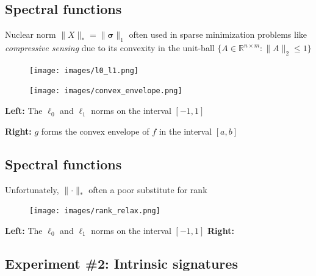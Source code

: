 \documentclass[
  letterpaper,
  DIV=11,
  numbers=noendperiod,
  oneside]{scrartcl}
\begin{document}
\subsection{Spectral functions}\label{spectral-functions-2}

Nuclear norm \(\lVert X \rVert_\ast = \lVert \mathbf{\sigma} \rVert_1\)
often used in sparse minimization problems like \emph{compressive
sensing} due to its convexity in the unit-ball
\(\{A \in \mathbb{R}^{n \times m} : \lVert A \rVert_2 \leq 1 \}\)

\begin{figure}

\begin{minipage}[b]{0.50\linewidth}

{\centering 

\texttt{[image: images/l0\_l1.png]}

}

\end{minipage}%
%
\begin{minipage}[b]{0.50\linewidth}

{\centering 

\texttt{[image: images/convex\_envelope.png]}

}

\end{minipage}%

\end{figure}

\textbf{Left:} The \(\ell_0\) and \(\ell_1\) norms on the interval
\([-1,1]\)

\textbf{Right:} \(g\) forms the convex envelope of \(f\) in the interval
\([a,b]\)

\subsection{Spectral functions}\label{spectral-functions-3}

Unfortunately, \(\lVert \cdot \rVert_\ast\) often a poor substitute for
rank

\begin{figure}

{\centering \texttt{[image: images/rank\_relax.png]}

}

\end{figure}

\textbf{Left:} The \(\ell_0\) and \(\ell_1\) norms on the interval
\([-1,1]\) \textbf{Right:}

\subsection{Experiment \#2: Intrinsic
signatures}\label{experiment-2-intrinsic-signatures}
\end{document}
